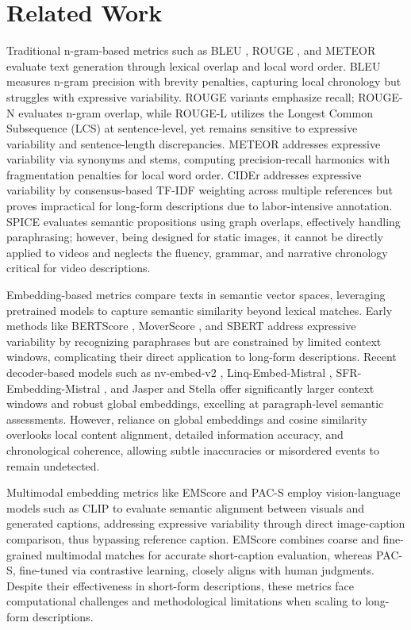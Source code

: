 \documentclass[letterpaper]{article} %
\begin{document}
\section{Related Work}

Traditional n-gram-based metrics such as BLEU \citep{p:02}, ROUGE \citep{l:04}, and METEOR \citep{bl:05} evaluate text generation through lexical overlap and local word order. BLEU measures n-gram precision with brevity penalties, capturing local chronology but struggles with expressive variability. ROUGE variants emphasize recall; ROUGE-N evaluates n-gram overlap, while ROUGE-L utilizes the Longest Common Subsequence (LCS) at sentence-level, yet remains sensitive to expressive variability and sentence-length discrepancies. METEOR addresses expressive variability via synonyms and stems, computing precision-recall harmonics with fragmentation penalties for local word order. CIDEr \citep{v:15} addresses expressive variability by consensus-based TF-IDF weighting across multiple references but proves impractical for long-form descriptions due to labor-intensive annotation. SPICE \citep{afjg:16} evaluates semantic propositions using graph overlaps, effectively handling paraphrasing; however, being designed for static images, it cannot be directly applied to videos and neglects the fluency, grammar, and narrative chronology critical for video descriptions.

Embedding-based metrics compare texts in semantic vector spaces, leveraging pretrained models to capture semantic similarity beyond lexical matches. Early methods like BERTScore \citep{z:20}, MoverScore \citep{z:19}, and SBERT \citep{r:19} address expressive variability by recognizing paraphrases but are constrained by limited context windows, complicating their direct application to long-form descriptions. Recent decoder-based models such as nv-embed-v2 \citep{l:24}, Linq-Embed-Mistral \citep{cklg:24}, SFR-Embedding-Mistral \citep{mljx:24}, and Jasper and Stella \citep{zlw:24} offer significantly larger context windows and robust global embeddings, excelling at paragraph-level semantic assessments. However, reliance on global embeddings and cosine similarity overlooks local content alignment, detailed information accuracy, and chronological coherence, allowing subtle inaccuracies or misordered events to remain undetected.

Multimodal embedding metrics like EMScore \citep{syxl:22} and PAC-S \citep{sbc:23} employ vision-language models such as CLIP \citep{Radford2021LearningTV} to evaluate semantic alignment between visuals and generated captions, addressing expressive variability through direct image-caption comparison, thus bypassing reference caption. EMScore combines coarse and fine-grained multimodal matches for accurate short-caption evaluation, whereas PAC-S, fine-tuned via contrastive learning, closely aligns with human judgments. Despite their effectiveness in short-form descriptions, these metrics face computational challenges and methodological limitations when scaling to long-form descriptions.
\end{document}
